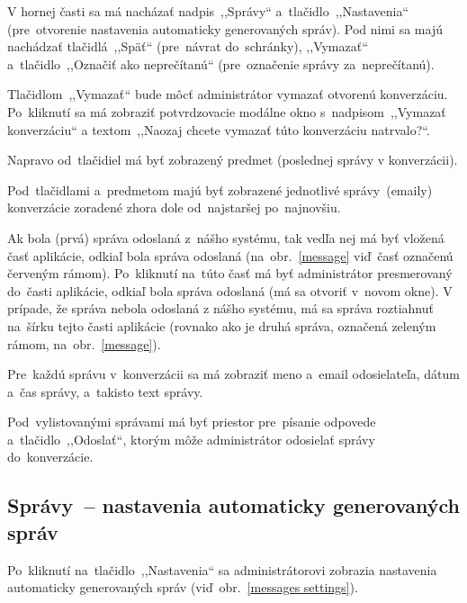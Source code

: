 V hornej časti sa má nacházať nadpis~,,Správy`` a~tlačidlo~,,Nastavenia`` (pre~otvorenie nastavenia automaticky generovaných správ). Pod nimi sa majú nachádzať tlačidlá~,,Späť`` (pre~návrat do~schránky), ,,Vymazať`` a~tlačidlo~,,Označiť ako neprečítanú`` (pre~označenie správy za~neprečítanú).

Tlačidlom~,,Vymazať`` bude môcť administrátor vymazať otvorenú konverzáciu. Po~kliknutí sa má zobraziť potvrdzovacie modálne okno s~nadpisom~,,Vymazať konverzáciu`` a textom~,,Naozaj chcete vymazať túto konverzáciu natrvalo?``.

Napravo od~tlačidiel má byť zobrazený predmet (poslednej správy v konverzácii).

Pod~tlačidlami a~predmetom majú byť zobrazené jednotlivé správy~(emaily) konverzácie zoradené zhora dole od~najstaršej po~najnovšiu.

Ak bola (prvá) správa odoslaná z~nášho systému, tak vedľa nej má byť vložená časť aplikácie, odkiaľ bola správa odoslaná (na~obr.~\ref{message} viď~časť označenú červeným rámom). Po~kliknutí na~túto časť má byť administrátor presmerovaný do~časti aplikácie, odkiaľ bola správa odoslaná (má sa otvoriť v~novom okne). V prípade, že správa nebola odoslaná z nášho systému, má sa správa roztiahnuť na~šírku tejto časti aplikácie (rovnako ako je druhá správa, označená zeleným rámom, na~obr.~\ref{message}).

Pre~každú správu v~konverzácii sa má zobraziť meno a~email odosielateľa, dátum a~čas správy, a~takisto text správy.

Pod~vylistovanými správami má byť priestor pre~písanie odpovede a~tlačidlo~,,Odoslať``, ktorým môže administrátor odosielať správy do~konverzácie.

\subsection{Správy~-- nastavenia automaticky generovaných správ}

Po~kliknutí na~tlačidlo~,,Nastavenia`` sa administrátorovi zobrazia nastavenia automaticky generovaných správ (viď~obr.~\ref{messages settings}).

